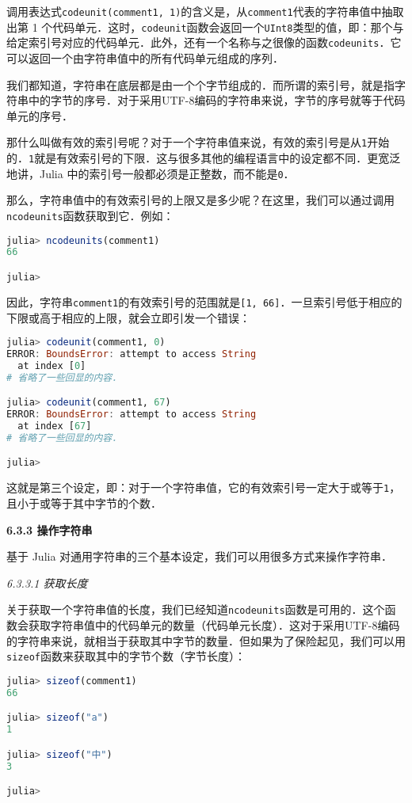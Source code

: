 调用表达式\verb|codeunit(comment1, 1)|的含义是，从\verb|comment1|代表的字符串值中抽取出第 1 个代码单元．这时，\verb|codeunit|函数会返回一个\verb|UInt8|类型的值，即：那个与给定索引号对应的代码单元．此外，还有一个名称与之很像的函数\verb|codeunits|．它可以返回一个由字符串值中的所有代码单元组成的序列．

我们都知道，字符串在底层都是由一个个字节组成的．而所谓的索引号，就是指字符串中的字节的序号．对于采用UTF-8编码的字符串来说，字节的序号就等于代码单元的序号．

那什么叫做有效的索引号呢？对于一个字符串值来说，有效的索引号是从\verb|1|开始的．\verb|1|就是有效索引号的下限．这与很多其他的编程语言中的设定都不同．更宽泛地讲，Julia 中的索引号一般都必须是正整数，而不能是\verb|0|．

那么，字符串值中的有效索引号的上限又是多少呢？在这里，我们可以通过调用\verb|ncodeunits|函数获取到它．例如：
\begin{lstlisting}[language=julia]
julia> ncodeunits(comment1)
66

julia> 
\end{lstlisting}

因此，字符串\verb|comment1|的有效索引号的范围就是\verb|[1, 66]|．一旦索引号低于相应的下限或高于相应的上限，就会立即引发一个错误：
\begin{lstlisting}[language=julia]
julia> codeunit(comment1, 0)
ERROR: BoundsError: attempt to access String
  at index [0]
# 省略了一些回显的内容．

julia> codeunit(comment1, 67)
ERROR: BoundsError: attempt to access String
  at index [67]
# 省略了一些回显的内容．

julia> 
\end{lstlisting}

这就是第三个设定，即：对于一个字符串值，它的有效索引号一定大于或等于\verb|1|，且小于或等于其中字节的个数．

\textbf{6.3.3 操作字符串}

基于 Julia 对通用字符串的三个基本设定，我们可以用很多方式来操作字符串．

\textsl{6.3.3.1 获取长度}

关于获取一个字符串值的长度，我们已经知道\verb|ncodeunits|函数是可用的．这个函数会获取字符串值中的代码单元的数量（代码单元长度）．这对于采用UTF-8编码的字符串来说，就相当于获取其中字节的数量．但如果为了保险起见，我们可以用\verb|sizeof|函数来获取其中的字节个数（字节长度）：
\begin{lstlisting}[language=julia]
julia> sizeof(comment1)
66

julia> sizeof("a")
1

julia> sizeof("中")
3

julia> 
\end{lstlisting}

